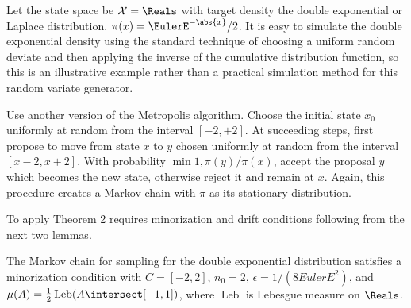 \documentclass[12pt]{article}
\begin{document}
\begin{example}

    Let the state space be \( \mathcal{X} = \Reals \) with target
    density the double exponential or Laplace distribution.  \( \pi(x) =
    \EulerE^{-\abs{x}}/2 \).  It is easy to simulate the double
    exponential density using the standard technique of choosing a
    uniform random deviate and then applying the inverse of the
    cumulative distribution function, so this is an illustrative example
    rather than a practical simulation method for this random variate
    generator.

    Use another version of the Metropolis algorithm.  Choose the initial
    state \( x_0 \) uniformly at random from the interval \( [ -2, +2] \).
    At succeeding steps, first propose to move from state \( x \) to \(
    y \) chosen uniformly at random from the interval \( [x - 2, x + 2] \).
    With probability \( \min{1, \pi(y)/\pi(x)} \), accept the proposal \(
    y \) which becomes the new state, otherwise reject it and remain at \(
    x \).  Again, this procedure creates a Markov chain with \( \pi \)
    as its stationary distribution.

    To apply Theorem 2 requires minorization and drift conditions
    following from the next two lemmas.

    \begin{lemma}
        The Markov chain for sampling for the double exponential
        distribution satisfies a minorization condition with \( C = [-2,
        2] \), \( n_0 = 2 \), \( \epsilon = 1/(8 EulerE^2) \), and \(
        \mu(A) = \frac{1}{2}
        \operatorname{Leb}
        (A \intersect [-1,1]) \), where \(
        \operatorname{Leb}
        \) is Lebesgue measure on \( \Reals \).
    \end{lemma}


\end{example}
\end{document}
